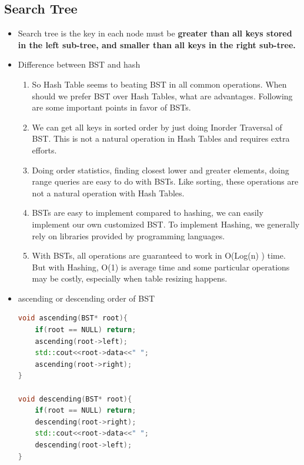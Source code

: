 \documentclass[a4paper,12pt,twoside]{book}
\begin{document}
\subsection{Search Tree}
\begin{itemize}
\item Search tree is the key in each node must be \textbf{greater than all keys stored in the left sub-tree, and smaller than all keys in the right sub-tree.} 

\item Difference between BST and hash
\begin{enumerate}
\item So Hash Table seems to beating BST in all common operations. When should we prefer BST over Hash Tables, what are advantages. Following are some important points in favor of BSTs.

\item We can get all keys in sorted order by just doing Inorder Traversal of BST. This is not a natural operation in Hash Tables and requires extra efforts.

\item Doing order statistics, finding closest lower and greater elements, doing range queries are easy to do with BSTs. Like sorting, these operations are not a natural operation with Hash Tables.

\item BSTs are easy to implement compared to hashing, we can easily implement our own customized BST. To implement Hashing, we generally rely on libraries provided by programming languages.

\item With BSTs, all operations are guaranteed to work in O(Log(n) ) time. But with Hashing, O(1) is average time and some particular operations may be costly, especially when table resizing happens.
\end{enumerate}

\item ascending or descending order of BST
\begin{lstlisting}[frame=single, language=c++]
void ascending(BST* root){
    if(root == NULL) return;
    ascending(root->left);
    std::cout<<root->data<<" ";
    ascending(root->right);
}
 
void descending(BST* root){
    if(root == NULL) return;
    descending(root->right);
    std::cout<<root->data<<" ";
    descending(root->left);
}
\end{lstlisting}

\end{itemize}
\end{document}
